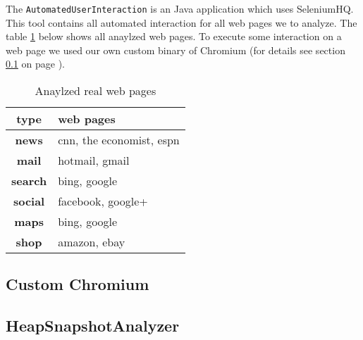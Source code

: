 		The \texttt{AutomatedUserInteraction} is an Java application which uses SeleniumHQ. This tool contains all automated interaction for all web pages we to analyze. The table \ref{tab:user_interactions} below shows all anaylzed web pages. To execute some interaction on a web page we used our own custom binary of Chromium (for details see section \ref{sec:custom_chromium} on page \pageref{sec:custom
		_chromium}).

		\begin{table}
			\centering
			\begin{tabular}{|c||l|}
				\hline
				\textbf{type} 	& \textbf{web pages}		\\ \hline \hline
				\textbf{news} 	& cnn\cite{Cnn13}, the economist\cite{Econ13}, espn	\\ \hline
				\textbf{mail} 	& hotmail, gmail 			\\ \hline
				\textbf{search}	& bing, google				\\ \hline
				\textbf{social}	& facebook, google+			\\ \hline
				\textbf{maps}	& bing, google				\\ \hline
				\textbf{shop}	& amazon, ebay				\\ \hline
			\end{tabular}
			\caption{Anaylzed real web pages}
			\label{tab:user_interactions}
		\end{table}
	\subsection{Custom Chromium} \label{sec:custom_chromium}
		

	\subsection{HeapSnapshotAnalyzer} \label{sec:heap_snapshot_analyzer}

